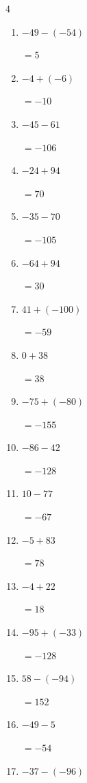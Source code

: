 \begin{multicols}{4}
\begin{enumerate}
  \item $-49-(-54)$

        $=5$

  \item $-4+(-6)$

        $=-10$

  \item $-45-61$

        $=-106$

  \item $-24+94$

        $=70$

  \item $-35-70$

        $=-105$

  \item $-64+94$

        $=30$

  \item $41+(-100)$

        $=-59$

  \item $0+38$

        $=38$

  \item $-75+(-80)$

        $=-155$

  \item $-86-42$

        $=-128$

  \item $10-77$

        $=-67$

\columnbreak %

  \item $-5+83$

        $=78$

  \item $-4+22$

        $=18$

  \item $-95+(-33)$

        $=-128$

  \item $58-(-94)$

        $=152$

  \item $-49-5$

        $=-54$

  \item $-37-(-96)$


\end{enumerate}
\end{multicols}
